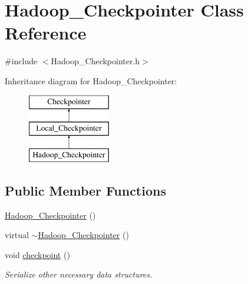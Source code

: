 \hypertarget{class_hadoop___checkpointer}{
\section{Hadoop\_\-Checkpointer Class Reference}
\label{class_hadoop___checkpointer}
}


{\ttfamily \#include $<$Hadoop\_\-Checkpointer.h$>$}

Inheritance diagram for Hadoop\_\-Checkpointer:\begin{figure}[H]
\begin{center}
\leavevmode
\includegraphics[height=3cm]{class_hadoop___checkpointer}
\end{center}
\end{figure}
\subsection*{Public Member Functions}
\begin{DoxyCompactItemize}
\item 
\hyperlink{class_hadoop___checkpointer_a977443dc2a2b2f9541a1773ece3edda4}{Hadoop\_\-Checkpointer} ()
\item 
virtual \hyperlink{class_hadoop___checkpointer_a173ccac3537fb73699d8746fb57c4ec6}{$\sim$Hadoop\_\-Checkpointer} ()
\item 
void \hyperlink{class_hadoop___checkpointer_acf19b7cb85d84a51584bd06de37e8fee}{checkpoint} ()
\begin{DoxyCompactList}\small\item\em Serialize other necessary data structures. \item\end{DoxyCompactList}\end{DoxyCompactItemize}


